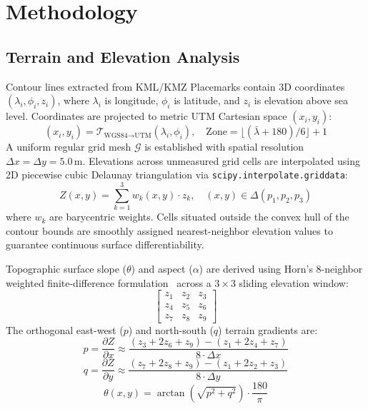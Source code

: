 \documentclass[manuscript,screen,review]{acmart}
\begin{document}
\section{Methodology}
\label{sec:methodology}

\subsection{Terrain and Elevation Analysis}
Contour lines extracted from KML/KMZ Placemarks contain 3D coordinates $(\lambda_i, \phi_i, z_i)$, where $\lambda_i$ is longitude, $\phi_i$ is latitude, and $z_i$ is elevation above sea level. Coordinates are projected to metric UTM Cartesian space $(x_i, y_i)$:
\begin{equation}
    (x_i, y_i) = \mathcal{T}_{\text{WGS84} \rightarrow \text{UTM}}(\lambda_i, \phi_i), \quad \text{Zone} = \lfloor(\bar{\lambda} + 180)/6\rfloor + 1
\end{equation}
A uniform regular grid mesh $\mathcal{G}$ is established with spatial resolution $\Delta x = \Delta y = 5.0$\,m. Elevations across unmeasured grid cells are interpolated using 2D piecewise cubic Delaunay triangulation via \texttt{scipy.interpolate.griddata}:
\begin{equation}
    Z(x, y) = \sum_{k=1}^3 w_k(x, y) \cdot z_k, \quad (x, y) \in \Delta(p_1, p_2, p_3)
\end{equation}
where $w_k$ are barycentric weights. Cells situated outside the convex hull of the contour bounds are smoothly assigned nearest-neighbor elevation values to guarantee continuous surface differentiability.

Topographic surface slope ($\theta$) and aspect ($\alpha$) are derived using Horn's 8-neighbor weighted finite-difference formulation~\cite{horn1981} across a $3 \times 3$ sliding elevation window:
\begin{equation}
\begin{bmatrix}
z_{1} & z_{2} & z_{3} \\
z_{4} & z_{5} & z_{6} \\
z_{7} & z_{8} & z_{9}
\end{bmatrix}
\end{equation}
The orthogonal east-west ($p$) and north-south ($q$) terrain gradients are:
\begin{equation}
    p = \frac{\partial Z}{\partial x} \approx \frac{(z_{3} + 2z_{6} + z_{9}) - (z_{1} + 2z_{4} + z_{7})}{8 \cdot \Delta x}
\end{equation}
\begin{equation}
    q = \frac{\partial Z}{\partial y} \approx \frac{(z_{7} + 2z_{8} + z_{9}) - (z_{1} + 2z_{2} + z_{3})}{8 \cdot \Delta y}
\end{equation}
\begin{equation}
    \theta(x, y) = \arctan\left(\sqrt{p^2 + q^2}\right) \cdot \frac{180}{\pi}
\end{equation}
\end{document}
